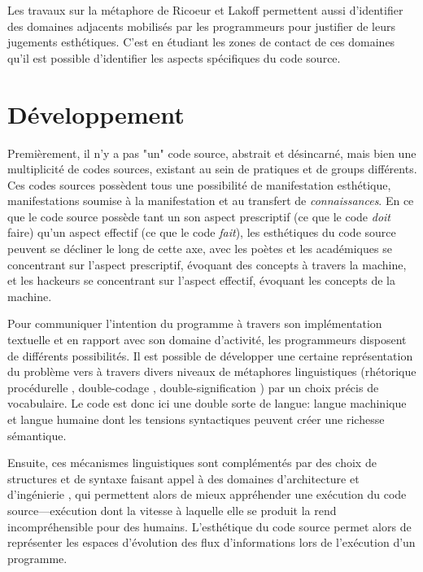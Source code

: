 \documentclass{article}
\begin{document}
Les travaux sur la métaphore de Ricoeur et Lakoff permettent aussi d'identifier des domaines adjacents mobilisés par les programmeurs pour justifier de leurs jugements esthétiques. C'est en étudiant les zones de contact de ces domaines qu'il est possible d'identifier les aspects spécifiques du code source.

\section{Développement}

Premièrement, il n'y a pas "un" code source, abstrait et désincarné, mais bien une multiplicité de codes sources, existant au sein de pratiques et de groups différents. Ces codes sources possèdent tous une possibilité de manifestation esthétique, manifestations soumise à la manifestation et au transfert de \emph{connaissances}. En ce que le code source possède tant un son aspect prescriptif (ce que le code \emph{doit} faire) qu'un aspect effectif (ce que le code \emph{fait}), les esthétiques du code source peuvent se décliner le long de cette axe, avec les poètes et les académiques se concentrant sur l'aspect prescriptif, évoquant des concepts à travers la machine, et les hackeurs se concentrant sur l'aspect effectif, évoquant les concepts de la machine.

Pour communiquer l'intention du programme à travers son implémentation textuelle et en rapport avec son domaine d'activité, les programmeurs disposent de différents possibilités. Il est possible de développer une certaine représentation du problème vers à travers divers niveaux de métaphores linguistiques (rhétorique procédurelle \citep{bogost_rhetoric_2008}, double-codage \citep{cox_speaking_2013}, double-signification \citep{paloque-berges_poetique_2009}) par un choix précis de vocabulaire. Le code est donc ici une double sorte de langue: langue machinique et langue humaine dont les tensions syntactiques peuvent créer une richesse sémantique.

Ensuite, ces mécanismes linguistiques sont complémentés par des choix de structures et de syntaxe faisant appel à des domaines d'architecture et d'ingénierie \citep{gabriel_patterns_1998,schummer_aesthetic_2009}, qui permettent alors de mieux appréhender une exécution du code source—exécution dont la vitesse à laquelle elle se produit la rend incompréhensible pour des humains. L'esthétique du code source permet alors de représenter les espaces d'évolution des flux d'informations lors de l'exécution d'un programme.
\end{document}

